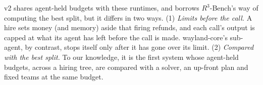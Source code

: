 \sys{} v2 shares agent-held budgets with these runtimes, and borrows $R^3$-Bench's way of computing the best split, but
it differs in two ways. (1) \emph{Limits before the call.} A hire sets money (and memory) aside that firing refunds, and
each call's output is capped at what its agent has left before the call is made. wayland-core's sub-agent, by
contrast, stops itself only after it has gone over its limit. (2) \emph{Compared with the best split.} To our
knowledge, it is the first system whose agent-held budgets, across a hiring tree, are compared with a solver, an
up-front plan and fixed teams at the same budget.
